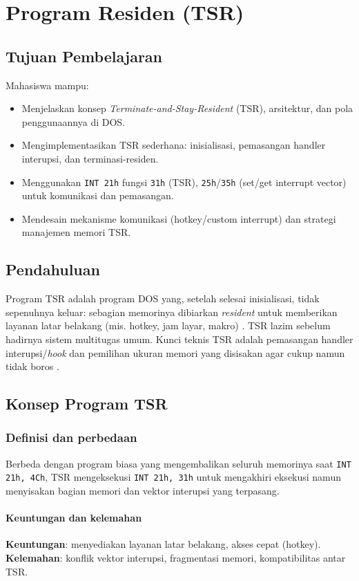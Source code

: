 \chapter{Program Residen (TSR)}

\section{Tujuan Pembelajaran}
Mahasiswa mampu:
\begin{itemize}
    \item Menjelaskan konsep \textit{Terminate-and-Stay-Resident} (TSR), arsitektur, dan pola penggunaannya di DOS.
    \item Mengimplementasikan TSR sederhana: inisialisasi, pemasangan handler interupsi, dan terminasi-residen.
    \item Menggunakan \texttt{INT 21h} fungsi \texttt{31h} (TSR), \texttt{25h}/\texttt{35h} (set/get interrupt vector) untuk komunikasi dan pemasangan.
    \item Mendesain mekanisme komunikasi (hotkey/custom interrupt) dan strategi manajemen memori TSR.
\end{itemize}

\section{Pendahuluan}
Program TSR adalah program DOS yang, setelah selesai inisialisasi, tidak sepenuhnya keluar: sebagian memorinya dibiarkan \textit{resident} untuk memberikan layanan latar belakang (mis. hotkey, jam layar, makro) \cite{susanto1995belajar}. TSR lazim sebelum hadirnya sistem multitugas umum. Kunci teknis TSR adalah pemasangan handler interupsi/\textit{hook} dan pemilihan ukuran memori yang disisakan agar cukup namun tidak boros \cite{hyde2010art}.

\section{Konsep Program TSR}
\subsection{Definisi dan perbedaan}
Berbeda dengan program biasa yang mengembalikan seluruh memorinya saat \texttt{INT 21h, 4Ch}, TSR mengeksekusi \texttt{INT 21h, 31h} untuk mengakhiri eksekusi namun menyisakan bagian memori dan vektor interupsi yang terpasang.

\subsubsection{Keuntungan dan kelemahan}
\textbf{Keuntungan}: menyediakan layanan latar belakang, akses cepat (hotkey). \textbf{Kelemahan}: konflik vektor interupsi, fragmentasi memori, kompatibilitas antar TSR.


